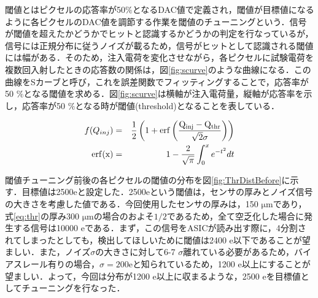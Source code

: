 %
閾値とはピクセルの応答率が50$\mathrm{\%}$となるDAC値で定義され，閾値が目標値になるように各ピクセルのDAC値を調節する作業を閾値のチューニングという．信号が閾値を超えたかどうかでヒットと認識するかどうかの判定を行なっているが，信号には正規分布に従うノイズが載るため，信号がヒットとして認識される閾値には幅がある．そのため，注入電荷を変化させながら，各ピクセルに試験電荷を複数回入射したときの応答数の関係は，図\ref{fig:scurve}のような曲線になる．この曲線をSカーブと呼び，これを誤差関数でフィッティングすることで，応答率が50 $\mathrm{\%}$となる閾値を求める．図\ref{fig:scurve}は横軸が注入電荷量，縦軸が応答率を示し，応答率が50 $\mathrm{\%}$となる時が閾値(threshold)となることを表している．


\begin{eqnarray}
  f(Q_{inj}) &=& \frac{1}{2} \left( 1 + \rm{erf} \left( \frac{Q_{inj} - Q_{thr}}{\sqrt{2} \sigma} \right) \right) \\
  \rm{erf}(x) &=& 1- \frac{2}{\sqrt{\pi}} \int^x _0 e^{-t^2} dt
  \label{eq:scurve}
\end{eqnarray}


閾値チューニング前後の各ピクセルの閾値の分布を図\ref{fig:ThrDistBefore}に示す．目標値は2500$\mathrm{e}$と設定した．2500$\mathrm{e}$という閾値は，センサの厚みとノイズ信号の大きさを考慮した値である．今回使用したセンサの厚みは，150 $\mathrm{\mu m}$であり，式\ref{eq:thr}の厚み300 $\mathrm{\mu m}$の場合のおよそ$1/2$であるため，全て空乏化した場合に発生する信号は10000 $\mathrm{e}$である．まず，この信号をASICが読み出す際に，4分割されてしまったとしても，検出してほしいために閾値は2400 $\mathrm{e}$以下であることが望ましい．また，ノイズ$\sigma$の大きさに対して6-7 $\sigma$離れている必要があるため，バイアスレール有りの場合，$\sigma = 200 \mathrm{e}$と知られているため，1200 $\mathrm{e}$以上にすることが望ましい．よって，今回は分布が1200 $\mathrm{e}$以上に収まるような，2500 $\mathrm{e}$を目標値としてチューニングを行なった．

